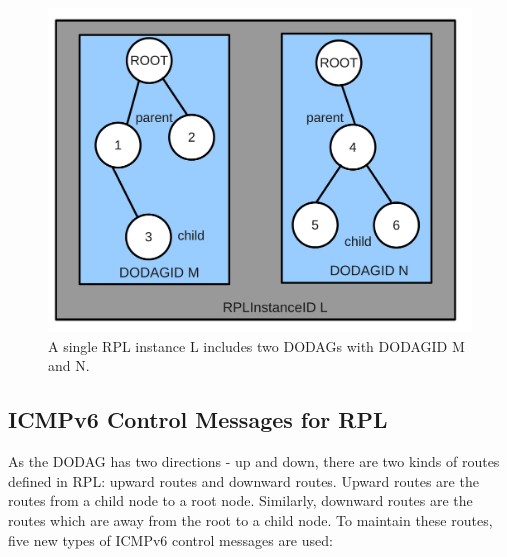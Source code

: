 \begin{figure}[htbp]
  \begin{center}
    \leavevmode
      \includegraphics[scale=0.25]{Pics/InstanceID.pdf}
    \caption{A single RPL instance L includes two DODAGs with DODAGID M and N.}
    \label{fig:InstanceID}
  \end{center}
\end{figure}

\subsection{ICMPv6 Control Messages for RPL}
\label{RPL:ICMP}

As the DODAG has two directions - up and down, there are two kinds of routes defined in RPL: upward routes and downward routes. Upward routes are the routes from a child node to a root node. Similarly, downward routes are the routes which are away from the root to a child node. To maintain these routes, five new types of ICMPv6 control messages are used:

